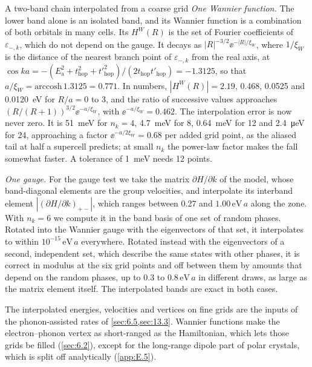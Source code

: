 \begin{workedexample}{A two-band chain interpolated from a coarse grid}
\emph{One Wannier function.} The lower band alone is an isolated band, and its Wannier function is a combination of both orbitals in many cells. Its $H^W(R)$ is the set of Fourier coefficients of $\varepsilon_{-,k}$, which do not depend on the gauge. It decays as $|R|^{-3/2}\ee^{-|R|/\xi_W}$, where $1/\xi_W$ is the distance of the nearest branch point of $\varepsilon_{-,k}$ from the real axis, at $\cos ka = -(E_{\mathrm{a}}^2 + t_{\mathrm{hop}}^2 + t'^2_{\mathrm{hop}})/(2t_{\mathrm{hop}}t'_{\mathrm{hop}}) = -1.3125$, so that $a/\xi_W = \mathrm{arccosh}\,1.3125 = 0.771$. In numbers, $|H^W(R)| = 2.19$, 0.468, 0.0525 and \SI{0.0120}{eV} for $R/a = 0$ to 3, and the ratio of successive values approaches $(R/(R+1))^{3/2}\ee^{-a/\xi_W}$, with $\ee^{-a/\xi_W} = 0.462$. The interpolation error is now never zero. It is \SI{51}{meV} for $n_k = 4$, \SI{4.7}{meV} for 8, \SI{0.64}{meV} for 12 and \SI{2.4}{\micro eV} for 24, approaching a factor $\ee^{-a/2\xi_W} = 0.68$ per added grid point, as the aliased tail at half a supercell predicts; at small $n_k$ the power-law factor makes the fall somewhat faster. A tolerance of \SI{1}{meV} needs 12 points.

\emph{One gauge.} For the gauge test we take the matrix $\partial H/\partial k$ of the model, whose band-diagonal elements are the group velocities, and interpolate its interband element $|(\partial H/\partial k)_{+-}|$, which ranges between 0.27 and $1.00\,\mathrm{eV}\,a$ along the zone. With $n_k = 6$ we compute it in the band basis of one set of random phases. Rotated into the Wannier gauge with the eigenvectors of that set, it interpolates to within $10^{-15}\,\mathrm{eV}\,a$ everywhere. Rotated instead with the eigenvectors of a second, independent set, which describe the same states with other phases, it is correct in modulus at the six grid points and off between them by amounts that depend on the random phases, up to 0.3 to $0.8\,\mathrm{eV}\,a$ in different draws, as large as the matrix element itself. The interpolated bands are exact in both cases.
\end{workedexample}

The interpolated energies, velocities and vertices on fine grids are the inputs of the phonon-assisted rates of \cref{sec:6.5,sec:13.3}. Wannier functions make the electron--phonon vertex as short-ranged as the Hamiltonian, which lets those grids be filled (\cref{sec:6.2}), except for the long-range dipole part of polar crystals, which is split off analytically (\cref{app:E.5}).
